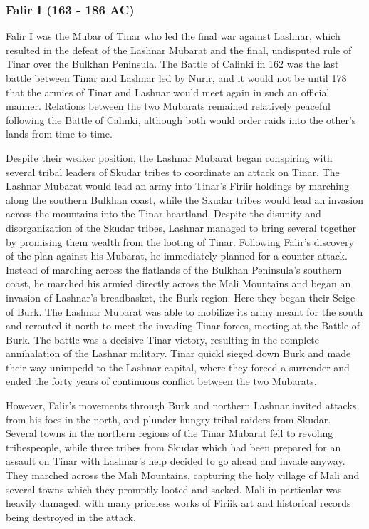 		\subsubsection{Falir I (163 - 186 AC)}
			Falir I was the Mubar of Tinar who led the final war against Lashnar, which resulted in the defeat of the Lashnar Mubarat and the final, undisputed rule of Tinar over the Bulkhan Peninsula. The Battle of Calinki in 162 was the last battle between Tinar and Lashnar led by Nurir, and it would not be until 178 that the armies of Tinar and Lashnar would meet again in such an official manner. Relations between the two Mubarats remained relatively peaceful following the Battle of Calinki, although both would order raids into the other's lands from time to time. 
			
			Despite their weaker position, the Lashnar Mubarat began conspiring with several tribal leaders of Skudar tribes to coordinate an attack on Tinar. The Lashnar Mubarat would lead an army into Tinar's Firiir holdings by marching along the southern Bulkhan coast, while the Skudar tribes would lead an invasion across the mountains into the Tinar heartland. Despite the disunity and disorganization of the Skudar tribes, Lashnar managed to bring several together by promising them wealth from the looting of Tinar. Following Falir's discovery of the plan against his Mubarat, he immediately planned for a counter-attack. Instead of marching across the flatlands of the Bulkhan Peninsula's southern coast, he marched his armied directly across the Mali Mountains and began an invasion of Lashnar's breadbasket, the Burk region. Here they began their Seige of Burk. The Lashnar Mubarat was able to mobilize its army meant for the south and rerouted it north to meet the invading Tinar forces, meeting at the Battle of Burk. The battle was a decisive Tinar victory, resulting in the complete annihalation of the Lashnar military. Tinar quickl sieged down Burk and made their way unimpedd to the Lashnar capital, where they forced a surrender and ended the forty years of continuous conflict between the two Mubarats.
			
			However, Falir's movements through Burk and northern Lashnar invited attacks from his foes in the north, and plunder-hungry tribal raiders from Skudar. Several towns in the northern regions of the Tinar Mubarat fell to revoling tribespeople, while three tribes from Skudar which had been prepared for an assault on Tinar with Lashnar's help decided to go ahead and invade anyway. They marched across the Mali Mountains, capturing the holy village of Mali and several towns which they promptly looted and sacked. Mali in particular was heavily damaged, with many priceless works of Firiik art and historical records being destroyed in the attack.
			
